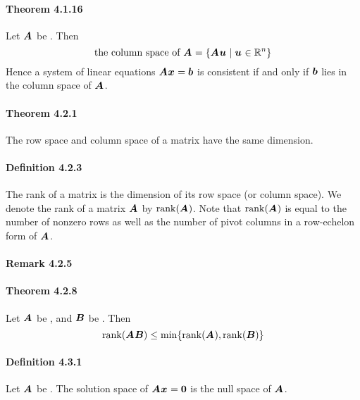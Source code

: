 \documentclass[a4paper]{article}
\newcommand{\R}{\mathbb{R}}
\begin{document}
\begin{multicols*}{3}
      \paragraph{Theorem 4.1.16} Let $\boldsymbol{A_{}}$ be . Then
        \begin{equation*}
          \text{the column space of } \A = \{ \A\u \;\vert\; \u \in \R^n \}
        \end{equation*}
        Hence a system of linear equations $\boldsymbol{A_{}}\boldsymbol{x_{}} = \boldsymbol{b}$ is consistent if and only if $\boldsymbol{b}$ lies in the column space of $\boldsymbol{A_{}}$.
      \paragraph{Theorem 4.2.1} The row space and column space of a matrix have the same dimension.
      \paragraph{Definition 4.2.3} The rank of a matrix is the dimension of its row space (or column space). We denote the rank of a matrix $\boldsymbol{A_{}}$ by $\mathrm{rank}(\boldsymbol{A_{}})$. Note that $\mathrm{rank}(\boldsymbol{A_{}})$ is equal to the number of nonzero rows as well as the number of pivot columns in a row-echelon form of $\boldsymbol{A_{}}$.
      \paragraph{Remark 4.2.5}
      \paragraph{Theorem 4.2.8} Let $\boldsymbol{A_{}}$ be , and $\boldsymbol{B}$ be . Then
        \begin{equation*}
          \mathrm{rank}(\boldsymbol{A_{}}\boldsymbol{B}) \leq \mathrm{min}\{ \mathrm{rank}(\boldsymbol{A_{}}), \mathrm{rank}(\boldsymbol{B}) \}
        \end{equation*}
      \paragraph{Definition 4.3.1} Let $\boldsymbol{A_{}}$ be . The solution space of $\boldsymbol{A_{}}\boldsymbol{x_{}} = \boldsymbol{0}$ is the null space of $\boldsymbol{A_{}}$.

\end{multicols*}
\end{document}
